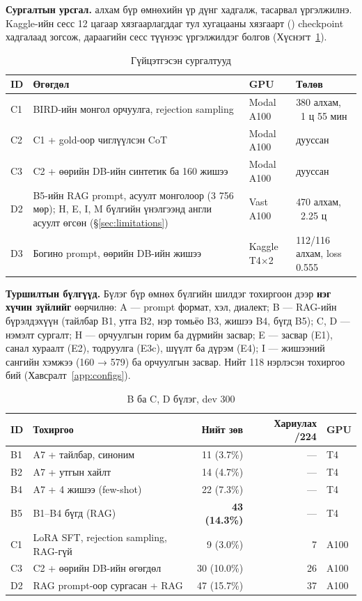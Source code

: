 \textbf{Сургалтын урсгал.}  алхам бүр өмнөхийн үр
дүнг хадгалж, тасарвал үргэлжилнэ. Kaggle-ийн сесс 12 цагаар хязгаарлагддаг тул хугацааны хязгаарт ()
checkpoint хадгалаад зогсож, дараагийн сесс түүнээс үргэлжилдэг болгов (Хүснэгт~\ref{tab:training}).

\begin{table}[H]
\centering\small
\caption{Гүйцэтгэсэн сургалтууд}
\label{tab:training}
\begin{tabularx}{\textwidth}{p{1.1cm}X p{2.2cm} p{3.2cm}}
\toprule
ID & Өгөгдөл & GPU & Төлөв \\
\midrule
C1 & BIRD-ийн монгол орчуулга, rejection sampling & Modal A100 & 380 алхам, ~1 ц 55 мин \\
C2 & C1 + gold-оор чиглүүлсэн CoT & Modal A100 & дууссан \\
C3 & C2 + өөрийн DB-ийн синтетик ба 160 жишээ & Modal A100 & дууссан \\
D2 & B5-ийн RAG prompt, асуулт монголоор (3 756 мөр); H, E, I, M бүлгийн үнэлгээнд англи асуулт өгсөн (§\ref{sec:limitations}) & Vast A100 & 470 алхам, ~2.25 ц \\
D3 & Богино prompt, өөрийн DB-ийн жишээ & Kaggle T4×2 & 112/116 алхам, loss 0.555 \\
\bottomrule
\end{tabularx}
\end{table}

\textbf{Туршилтын бүлгүүд.} Бүлэг бүр өмнөх бүлгийн шилдэг тохиргоон дээр \textbf{нэг хүчин зүйлийг} өөрчилнө: A ---
prompt формат, хэл, диалект; B --- RAG-ийн бүрэлдэхүүн (тайлбар B1, утга B2, нэр томьёо B3, жишээ B4, бүгд B5); C, D ---
нэмэлт сургалт; H --- орчуулгын горим ба дүрмийн засвар; E --- засвар (E1), санал хураалт (E2), тодруулга (E3c), шүүлт ба
дүрэм (E4); I --- жишээний сангийн хэмжээ (160 → 579) ба орчуулгын засвар. Нийт 118 нэрлэсэн тохиргоо бий (Хавсралт~\ref{app:configs}).

\begin{table}[H]
\centering\small
\caption{B ба C, D бүлэг, dev 300}
\label{tab:bc-group}
\begin{tabularx}{\textwidth}{p{1.2cm}X r r p{1.2cm}}
\toprule
ID & Тохиргоо & Нийт зөв & Хариулах /224 & GPU \\
\midrule
B1 & A7 + тайлбар, синоним & 11 (3.7\%) & --- & T4 \\
B2 & A7 + утгын хайлт & 14 (4.7\%) & --- & T4 \\
B4 & A7 + 4 жишээ (few-shot) & 22 (7.3\%) & --- & T4 \\
B5 & B1--B4 бүгд (RAG) & \textbf{43 (14.3\%)} & --- & T4 \\
C1 & LoRA SFT, rejection sampling, RAG-гүй & 9 (3.0\%) & 7 & A100 \\
C3 & C2 + өөрийн DB-ийн өгөгдөл & 30 (10.0\%) & 26 & A100 \\
D2 & RAG prompt-оор сургасан + RAG & 47 (15.7\%) & 37 & A100 \\
\bottomrule
\end{tabularx}
\end{table}

